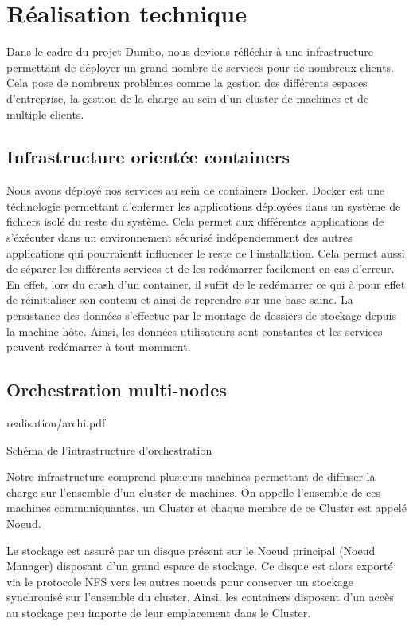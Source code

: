 \section{Réalisation technique}

Dans le cadre du projet Dumbo, nous devions réfléchir à une infrastructure permettant de déployer un grand nombre de services pour de nombreux clients.
Cela pose de nombreux problèmes comme la gestion des différents espaces d'entreprise, la gestion de la charge au sein d'un cluster de machines et de multiple clients.

\subsection{Infrastructure orientée containers}

Nous avons déployé nos services au sein de containers Docker.
Docker est une téchnologie permettant d'enfermer les applications déployées dans un système de fichiers isolé du reste du système.
Cela permet aux différentes applications de s'éxécuter dans un environnement sécurisé indépendemment des autres applications qui pourraientt influencer le reste de l'installation.
Cela permet aussi de séparer les différents services et de les redémarrer facilement en cas d'erreur.
En effet, lors du crash d'un container, il suffit de le redémarrer ce qui à pour effet de réinitialiser son contenu et ainsi de reprendre sur une base saine.
La persistance des données s'effectue par le montage de dossiers de stockage depuis la machine hôte.
Ainsi, les données utilisateurs sont constantes et les services peuvent redémarrer à tout momment.

\subsection{Orchestration multi-nodes}

\begin{figue}{1}{realisation/archi.pdf}
\caption{Schéma de l'intrastructure d'orchestration}
\end{figue}

Notre infrastructure comprend plusieurs machines permettant de diffuser la charge sur l'ensemble d'un cluster de machines.
On appelle l'ensemble de ces machines communiquantes, un Cluster et chaque membre de ce Cluster est appelé Noeud.

Le stockage est assuré par un disque présent sur le Noeud principal (Noeud Manager) disposant d'un grand espace de stockage.
Ce disque est alors exporté via le protocole NFS vers les autres noeuds pour conserver un stockage synchronisé sur l'ensemble du cluster.
Ainsi, les containers disposent d'un accès au stockage peu importe de leur emplacement dans le Cluster.

